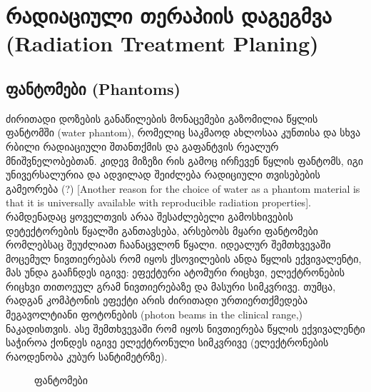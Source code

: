 \documentclass[12pt,a4paper,]{report}
\begin{document}
\chapter{რადიაციული თერაპიის დაგეგმვა (Radiation Treatment Planing)}
\section{ფანტომები (Phantoms)}
ძირითადი დოზების განაწილების მონაცემები გაზომილია წყლის ფანტომში (water phantom), რომელიც საკმაოდ ახლოსაა კუნთისა და სხვა რბილი რადიაციული შთანთქმის და გაფანტვის რეალურ მნიშვნელობებთან. კიდევ მიზეზი რის გამოც ირჩევენ წყლის ფანტომს, იგი უნივერსალურია და ადვილად შეიძლება რადიციული თვისებების გამეორება (?) [Another reason for the choice of water as a phantom material is that it is universally available with reproducible radiation properties]. რამდენადაც ყოველთვის არაა შესაძლებელი გამოსხივების დეტექტორების წყალში განთავსება, არსებობს მყარი ფანტომები რომლებსაც შეუძლიათ ჩაანაცვლონ წყალი. იდეალურ შემთხვევაში მოცემულ ნივთიერებას რომ იყოს ქსოვილების ანდა წყლის ექვივალენტი, მას უნდა გააჩნდეს იგივე: ეფექტური ატომური რიცხვი, ელექტრონების რიცხვი თითოეულ გრამ ნივთიერებაზე და მასური სიმკვრივე. თუმცა, რადგან კომპტონის ეფექტი არის ძირითადი ურთიერთქმედება მეგავოლტიანი ფოტონების (photon beams in the clinical range,) ნაკადისთვის. ასე შემთხვევაში რომ იყოს ნივთიერება წყლის ექვივალენტი საჭიროა ქონდეს იგივე ელექტრონული სიმკვრივე (ელექტრონების რაოდენობა კუბურ სანტიმეტრზე).

	\begin{figure}[h]%
    	\centering
    	\qquad
    	\caption{ფანტომები}%
    	\label{fig:phantom}%
	\end{figure}
\end{document}
